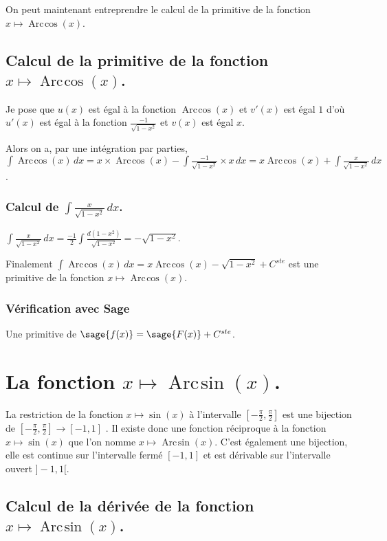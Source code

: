 \documentclass[a4paper,landscape,17pt]{extreport} %
\renewcommand{\arcsin}{\mathop{\mathrm{Arc\mspace{2mu}sin}}}
\renewcommand{\arccos}{\mathop{\mathrm{Arc\mspace{2mu}cos}}}
\begin{document}
On peut maintenant entreprendre le calcul de la primitive de la  fonction  $x \mapsto \arccos(x) $.

\subsection{Calcul de la primitive de la fonction  $x \mapsto \arccos(x) $.}


Je pose que $u(x)$  est égal à la fonction $\arccos(x)$ et $v'(x)$ est égal $1$  d'où $u'(x)$  est égal à la fonction $ \frac{-1}{\sqrt{1- x^2}} $ et $v(x)$ est égal $x$.

Alors on a, par une intégration par parties, $\int \arccos(x) \, dx = x \times \arccos(x) -\int \frac{-1}{\sqrt{1- x^2}} \times x \, dx =  x \arccos(x) + \int \frac{x}{\sqrt{1- x^2}} \, dx $.


\subsubsection*{Calcul de $\int \frac{x}{\sqrt{1- x^2}} \, dx $.}

$\int \frac{x}{\sqrt{1- x^2}} \, dx = \frac{-1}{2} \int \frac{d(1-x^2)}{\sqrt{1- x^2}}= -\sqrt{1- x^2} $.


Finalement $\int \arccos(x) \, dx = x  \arccos(x) - \sqrt{1- x^2} + C^{ste} $ est une primitive de la fonction $x \mapsto \arccos(x) $.

\subsubsection*{Vérification avec Sage}

Une primitive de $\sage{f(x)} = \sage{F(x)} + C^{ste}$.


\section{La fonction  $x \mapsto \arcsin(x) $.}

La restriction de la fonction $x \mapsto \sin(x) $ à l'intervalle $\left[-\frac{\pi}{2},\frac{\pi}{2}\right]$ est une bijection de $\left[-\frac{\pi}{2},\frac{\pi}{2}\right] \rightarrow [-1,1]$ . Il existe donc une fonction réciproque à la fonction $x \mapsto \sin(x) $ que l'on nomme $x \mapsto \arcsin(x) $. C'est également une bijection, elle est continue sur l'intervalle fermé  $ [-1,1]$ et est dérivable sur l'intervalle ouvert $]-1,1[$.

\subsection{Calcul de la dérivée de la fonction $x \mapsto \arcsin(x) $.}
\end{document}
